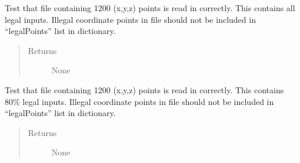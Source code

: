 \documentclass[letterpaper,10pt,english]{sphinxmanual}
\begin{document}
\begin{fulllineitems}
\begin{fulllineitems}
\begin{quote}
\begin{description}
\end{description}\end{quote}

\end{fulllineitems}


\begin{fulllineitems}
\label{\detokenize{index:src.Tests.Graph_Test.Graph_Test.test_readCoordinates_size1200_allLegal}}
Test that file containing 1200 (x,y,z) points is read in correctly. This contains all legal inputs.
Illegal coordinate points in file should not be included in “legalPoints” list in dictionary.
\begin{quote}\begin{description}
\item[{Returns}] \leavevmode
None

\end{description}\end{quote}

\end{fulllineitems}


\begin{fulllineitems}
\label{\detokenize{index:src.Tests.Graph_Test.Graph_Test.test_readCoordinates_size1200_someLegal}}
Test that file containing 1200 (x,y,z) points is read in correctly. This contains 80\% legal inputs.
Illegal coordinate points in file should not be included in “legalPoints” list in dictionary.
\begin{quote}\begin{description}
\item[{Returns}] \leavevmode
None

\end{description}\end{quote}

\end{fulllineitems}


\end{fulllineitems}
\end{document}
